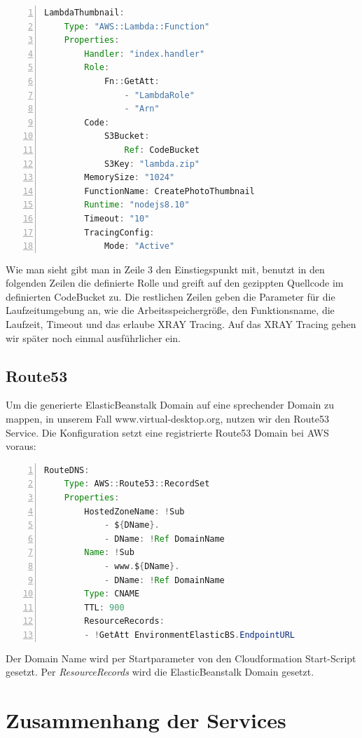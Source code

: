 \documentclass[a4paper, 12pt]{scrreprt}
\begin{document}
\begin{lstlisting}[xleftmargin=\parindent,numbers=left,numberstyle=\small,numbersep=8pt,frame=L,mathescape=true, basicstyle=\small, language=Java, lineskip={1.0pt}]
LambdaThumbnail:
    Type: "AWS::Lambda::Function"
    Properties: 
        Handler: "index.handler"
        Role: 
            Fn::GetAtt: 
                - "LambdaRole"
                - "Arn"
        Code:
            S3Bucket:
                Ref: CodeBucket
            S3Key: "lambda.zip"
        MemorySize: "1024"
        FunctionName: CreatePhotoThumbnail
        Runtime: "nodejs8.10"
        Timeout: "10"
        TracingConfig:
            Mode: "Active"
\end{lstlisting}

Wie man sieht gibt man in Zeile 3 den Einstiegspunkt mit, benutzt in den folgenden Zeilen die definierte Rolle und greift auf den gezippten Quellcode im definierten CodeBucket zu. Die restlichen Zeilen geben die Parameter für die Laufzeitumgebung an, wie die Arbeitsspeichergröße, den Funktionsname, die Laufzeit, Timeout und das erlaube XRAY Tracing. Auf das XRAY Tracing gehen wir später noch einmal ausführlicher ein.

\subsection{Route53}
Um die generierte ElasticBeanstalk Domain auf eine sprechender Domain zu mappen, in unserem Fall www.virtual-desktop.org, nutzen wir den Route53 Service. Die Konfiguration setzt eine registrierte Route53 Domain bei AWS voraus:

\begin{lstlisting}[xleftmargin=\parindent,numbers=left,numberstyle=\small,numbersep=8pt,frame=L,mathescape=true, basicstyle=\small, language=Java, lineskip={1.0pt}]
RouteDNS:
    Type: AWS::Route53::RecordSet
    Properties:
        HostedZoneName: !Sub
            - ${DName}.
            - DName: !Ref DomainName
        Name: !Sub
            - www.${DName}.
            - DName: !Ref DomainName
        Type: CNAME
        TTL: 900
        ResourceRecords:
        - !GetAtt EnvironmentElasticBS.EndpointURL
\end{lstlisting}

Der Domain Name wird per Startparameter von den Cloudformation Start-Script gesetzt. Per \textit{ResourceRecords} wird die ElasticBeanstalk Domain gesetzt.
 
\section{Zusammenhang der Services}
%
\end{document}
